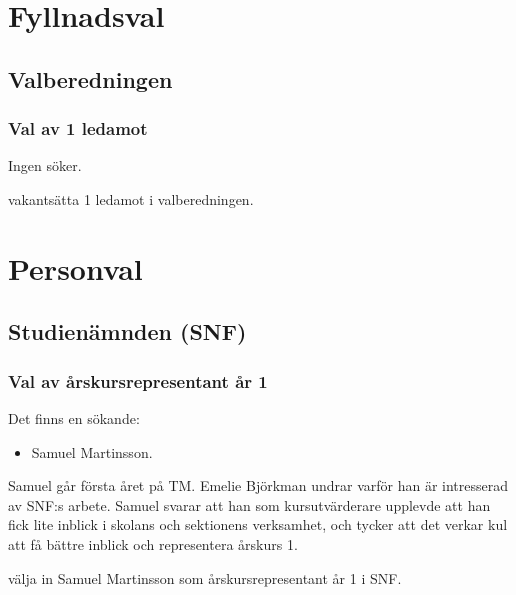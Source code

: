\documentclass[hidelinks]{sektionsmote}
\begin{document}
\section{Fyllnadsval}

\subsection{Valberedningen}

\subsubsection{Val av 1 ledamot}
Ingen söker.
\begin{beslut}
    \item vakantsätta 1 ledamot i valberedningen.
\end{beslut}


\section{Personval}

\subsection{Studienämnden (SNF)}

\subsubsection{Val av årskursrepresentant år 1}
Det finns en sökande:
\begin{itemize}
    \item Samuel Martinsson.
\end{itemize}

Samuel går första året på TM.
Emelie Björkman undrar varför han är intresserad av SNF:s arbete.
Samuel svarar att han som kursutvärderare upplevde att han fick lite inblick i skolans och sektionens verksamhet, och tycker att det verkar kul att få bättre inblick och representera årskurs 1.
\begin{beslut}
    \item välja in Samuel Martinsson som årskursrepresentant år 1 i SNF.
\end{beslut}
\end{document}
